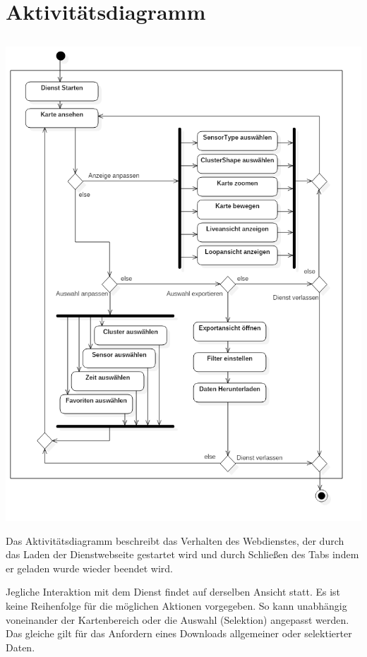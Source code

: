 \section{Aktivitätsdiagramm}
    \subsection{}
        \includegraphics[width=1\linewidth]{diagrams/ActivityDiagram1.png}
        
        Das Aktivitätsdiagramm beschreibt das Verhalten des Webdienstes, der durch das Laden der Dienstwebseite gestartet wird und durch Schließen des Tabs indem er geladen wurde wieder beendet wird.
        
        Jegliche Interaktion mit dem Dienst findet auf derselben Ansicht statt. Es ist keine Reihenfolge für die möglichen Aktionen vorgegeben. So kann unabhängig voneinander der Kartenbereich oder die Auswahl (Selektion) angepasst werden. Das gleiche gilt für das Anfordern eines Downloads allgemeiner oder selektierter Daten.
        
